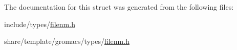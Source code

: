 \-The documentation for this struct was generated from the following files\-:\begin{DoxyCompactItemize}
\item 
include/types/\hyperlink{include_2types_2filenm_8h}{filenm.\-h}\item 
share/template/gromacs/types/\hyperlink{share_2template_2gromacs_2types_2filenm_8h}{filenm.\-h}\end{DoxyCompactItemize}
